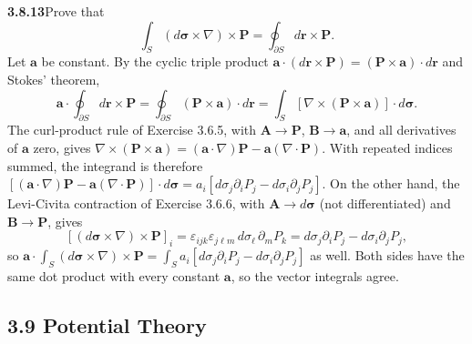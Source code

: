 \par\bigskip
\noindent\textbf{3.8.13}\quad Prove that
\[
\int_{S}(d\boldsymbol{\sigma}\times\nabla)\times\mathbf{P}
=\oint_{\partial S}d\mathbf{r}\times\mathbf{P}.
\]
\solution
Let $\mathbf a$ be constant. By the cyclic triple product
$\mathbf a\cdot(d\mathbf r\times\mathbf P)
=(\mathbf P\times\mathbf a)\cdot d\mathbf r$ and Stokes' theorem,
\[
\mathbf a\cdot\oint_{\partial S}d\mathbf r\times\mathbf P
=\oint_{\partial S}(\mathbf P\times\mathbf a)\cdot d\mathbf r
=\int_S[\nabla\times(\mathbf P\times\mathbf a)]\cdot d\boldsymbol\sigma.
\]
The curl-product rule of Exercise 3.6.5, with $\mathbf A\to\mathbf P$,
$\mathbf B\to\mathbf a$, and all derivatives of $\mathbf a$ zero, gives
$\nabla\times(\mathbf P\times\mathbf a)
=(\mathbf a\cdot\nabla)\mathbf P-\mathbf a(\nabla\cdot\mathbf P)$.
With repeated indices summed, the integrand is therefore
$[(\mathbf a\cdot\nabla)\mathbf P-\mathbf a(\nabla\cdot\mathbf P)]
\cdot d\boldsymbol\sigma
=a_i[d\sigma_j\partial_iP_j-d\sigma_i\partial_jP_j]$.
On the other hand, the Levi-Civita contraction of Exercise 3.6.6, with
$\mathbf A\to d\boldsymbol\sigma$ (not differentiated) and
$\mathbf B\to\mathbf P$, gives
\[
[(d\boldsymbol\sigma\times\nabla)\times\mathbf P]_i
=\varepsilon_{ijk}\varepsilon_{j\ell m}\,d\sigma_\ell\,\partial_mP_k
=d\sigma_j\partial_iP_j-d\sigma_i\partial_jP_j,
\]
so $\mathbf a\cdot\int_S(d\boldsymbol\sigma\times\nabla)\times\mathbf P
=\int_Sa_i[d\sigma_j\partial_iP_j-d\sigma_i\partial_jP_j]$ as well.
Both sides have the same dot product with every constant $\mathbf a$,
so the vector integrals agree.

\subsection*{3.9 Potential Theory}

